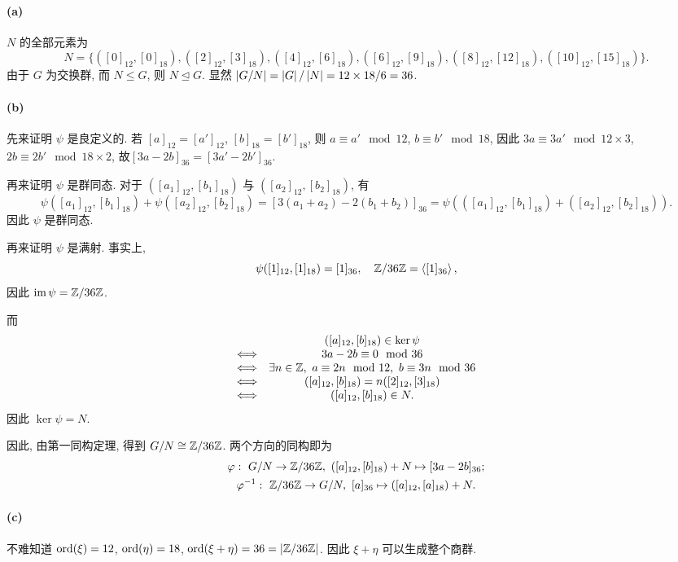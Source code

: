 \documentclass{article}
\begin{document}
\begin{solution}
	\paragraph{(a)} $N$ 的全部元素为
	\[ N = \{([0]_{12}, [0]_{18}), ([2]_{12}, [3]_{18}), ([4]_{12}, [6]_{18}), ([6]_{12}, [9]_{18}), ([8]_{12}, [12]_{18}), ([10]_{12}, [15]_{18})\}. \]
	由于 $G$ 为交换群, 而 $N \le G$, 则 $N \unlhd G$. 显然 $\left|G/N\right| = \left|G\right| / \left|N\right| = 12 \times 18 / 6 = 36$.

	\paragraph{(b)} 先来证明 $\psi$ 是良定义的. 若 $[a]_{12} = [a']_{12}$, $[b]_{18} = [b']_{18}$, 则 $a \equiv a' \mod 12$, $b \equiv b' \mod 18$, 因此 $3a \equiv 3a' \mod 12 \times 3$, $2b \equiv 2b' \mod 18 \times 2$, 故$[3a-2b]_{36} = [3a'-2b']_{36}$.

	再来证明 $\psi$ 是群同态. 对于 $([a_1]_{12}, [b_1]_{18}	)$ 与 $([a_2]_{12}, [b_2]_{18})$, 有
	\[ \psi([a_1]_{12}, [b_1]_{18}) + \psi([a_2]_{12}, [b_2]_{18}) = [3(a_1+a_2) - 2(b_1+b_2)]_{36} = \psi(([a_1]_{12}, [b_1]_{18})+([a_2]_{12}, [b_2]_{18})). \]
	因此 $\psi$ 是群同态.

	再来证明 $\psi$ 是满射. 事实上, 
	\[ \psi([1]_{12}, [1]_{18}) = [1]_{36}, \quad \mathbb{Z}/36\mathbb{Z} = \left\langle [1]_{36} \right\rangle, \]
	因此 $\operatorname{im} \psi = \mathbb{Z}/36\mathbb{Z}$. 
	
	而
	\[ \begin{array}{cc}
		& ([a]_{12}, [b]_{18}) \in \ker \psi \\
		\Longleftrightarrow & 3a - 2b \equiv 0 \mod 36 \\
		\Longleftrightarrow & \exists n \in \mathbb{Z},\ a \equiv 2n \mod 12,\ b \equiv 3n \mod 36 \\
		\Longleftrightarrow & ([a]_{12}, [b]_{18}) = n([2]_{12}, [3]_{18}) \\
		\Longleftrightarrow & ([a]_{12}, [b]_{18}) \in N.
	\end{array} \] 
	因此 $\ker \psi = N$. 

	因此, 由第一同构定理, 得到 $G/N \cong \mathbb{Z}/36\mathbb{Z}$. 两个方向的同构即为
	\begin{gather*}
		\varphi: \ G/N \to \mathbb{Z}/36\mathbb{Z}, \ ([a]_{12}, [b]_{18})+N \mapsto [3a-2b]_{36}; \\
		\varphi^{-1}: \ \mathbb{Z}/36\mathbb{Z} \to G/N, \ [a]_{36} \mapsto ([a]_{12}, [a]_{18})+N.
	\end{gather*}

	\paragraph{(c)} 不难知道 $\operatorname{ord}(\xi) = 12$, $\operatorname{ord}(\eta) = 18$, $\operatorname{ord}(\xi + \eta) = 36 = \left|\mathbb{Z}/36\mathbb{Z}\right|$. 因此 $\xi + \eta$ 可以生成整个商群.
\end{solution}
\end{document}
